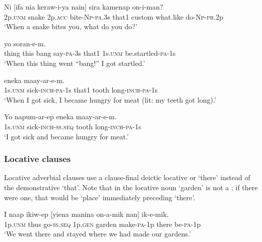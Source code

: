 \ea%
\label{ex:8:x1540}
\gll Ni  [ifa  nia  keraw-i-ya  nain]  sira  kamenap on-i-man?\\
2p.\textsc{unm} snake 2p.\textsc{acc} bite-\textsc{Np}-\textsc{pa}.3s  that1 custom  what.like do-\textsc{Np}-\textsc{pr}.2p\\
\glt`When a snake bites you, what do you do?'
\z


\ea%
\label{ex:8:x1569}
  yo  soran-e-m.\\
thing  this  bang  say-\textsc{pa}-3s  that1  1s.\textsc{unm}  be.startled-\textsc{pa}-1s\\
\glt`When this thing went ``bang!'' I got startled.'
\z


\ea%
\label{ex:8:x1624}
  eneka  maay-ar-e-m. \\
1s.\textsc{unm} sick-\textsc{inch}-\textsc{pa}-1s that1 tooth long-\textsc{inch}-\textsc{pa}-1s\\
\glt`When I got sick, I became hungry for meat (lit: my teeth got long).'
\z


\ea%
\label{ex:8:x1632}
\gll Yo  napum-ar-ep  eneka  maay-ar-e-m.\\
1s.\textsc{unm} sick-\textsc{inch}-\textsc{ss}.\textsc{seq} tooth  long-\textsc{inch}-\textsc{pa}-1s\\
\glt`I got sick and became hungry for meat.'
\z


\subsubsection{Locative clauses} \label{sec:8.3.3.2}

Locative adverbial clauses use a clause-final deictic locative  or  `there' instead of the demonstrative   `that'. Note that in  the locative noun  `garden' is not a ; if there were one, that would be  `place' immediately preceding  `there'. 

\ea%
\label{ex:8:x1621}
\gll I  naap  ikiw-ep  [yiena  manina  on-a-mik  nan] ik-e-mik.\\
1p.\textsc{unm} thus  go-\textsc{ss}.\textsc{seq} 1p.\textsc{gen} garden  make-\textsc{pa}-1p  there be-\textsc{pa}-1p\\
\glt`We went there and stayed where we had made our gardens.'
\z



